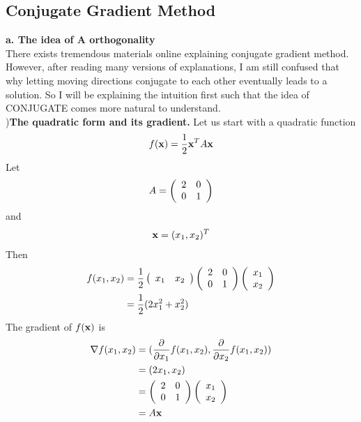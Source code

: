 \documentclass[a4paper]{article}
\begin{document}
\subsection{Conjugate Gradient Method}
{\bf a. The idea of A orthogonality}\\
There exists tremendous materials online explaining conjugate gradient method. However, after reading many versions of explanations, I am still confused that why letting moving directions conjugate to each other eventually leads to a solution. So I will be explaining the intuition first such that the idea of CONJUGATE comes more natural to understand.\\
){\bf The quadratic form and its gradient.} Let us start with a quadratic function 
\begin{align*}
f({\bf x})   =  \frac{1}{2}{\bf x}^T A {\bf x}
\end{align*}
Let
\begin{align*}
A =  \left( \begin{array} {c c}
			2 & 0 \\
			0 & 1 \\
			\end{array}
			\right)
\end{align*}
and 
\begin{align*}
{\bf x} = (x_1, x_2 ) ^T
\end{align*}
Then
\begin{align*}
	f(x_1, x_2) 
		   & = \frac{1}{2} 
		   \left( \begin{array} {c c}
			x_1 & x_2 \\
			\end{array}
			\right)
		   \left( \begin{array} {c c}
			2 & 0 \\
			0 & 1 \\
			\end{array}
			\right)
			\left( \begin{array} {c}
			x_1  \\
			x_2  \\
			\end{array}
			\right) \\
& = \frac{1}{2} ( 2x_1^2 + x_2^2)
\end{align*}
The gradient of $f({\bf x})$ is\\
\begin{align*}
   \nabla f(x_1, x_2)  & = (\frac{\partial }{\partial x_1} f(x_1,x_2), 
	\frac{\partial }{\partial x_2} f(x_1, x_2) ) \\
                              & = (2x_1 , x_2) \\
        & =  \left( \begin{array} {c c}
			2 & 0 \\
			0 & 1 \\
			\end{array}
			\right)
\left( \begin{array} {c}
			x_1  \\
			x_2  \\
			\end{array}
			\right)\\
            & = A{\bf x}
\end{align*}
\end{document}
